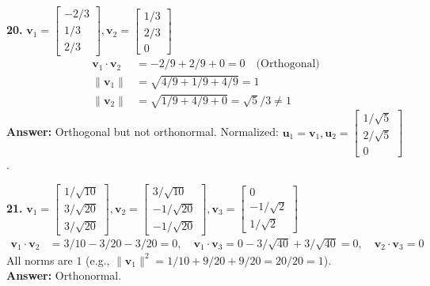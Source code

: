 \documentclass[11pt, letterpaper]{article}
\theoremstyle{definition}
\theoremstyle{remark}
\begin{document}
\textbf{20.} $\mathbf{v}_1 = \begin{bmatrix} -2/3 \\ 1/3 \\ 2/3 \end{bmatrix}, \mathbf{v}_2 = \begin{bmatrix} 1/3 \\ 2/3 \\ 0 \end{bmatrix}$
\begin{align*}
    \mathbf{v}_1 \cdot \mathbf{v}_2 &= -2/9 + 2/9 + 0 = 0 \quad \text{(Orthogonal)} \\
    \|\mathbf{v}_1\| &= \sqrt{4/9 + 1/9 + 4/9} = 1 \\
    \|\mathbf{v}_2\| &= \sqrt{1/9 + 4/9 + 0} = \sqrt{5}/3 \neq 1
\end{align*}
\textbf{Answer:} Orthogonal but not orthonormal. Normalized: $\mathbf{u}_1 = \mathbf{v}_1, \mathbf{u}_2 = \begin{bmatrix} 1/\sqrt{5} \\ 2/\sqrt{5} \\ 0 \end{bmatrix}$.

\textbf{21.} $\mathbf{v}_1 = \begin{bmatrix} 1/\sqrt{10} \\ 3/\sqrt{20} \\ 3/\sqrt{20} \end{bmatrix}, \mathbf{v}_2 = \begin{bmatrix} 3/\sqrt{10} \\ -1/\sqrt{20} \\ -1/\sqrt{20} \end{bmatrix}, \mathbf{v}_3 = \begin{bmatrix} 0 \\ -1/\sqrt{2} \\ 1/\sqrt{2} \end{bmatrix}$
\begin{align*}
    \mathbf{v}_1 \cdot \mathbf{v}_2 &= 3/10 - 3/20 - 3/20 = 0, \quad \mathbf{v}_1 \cdot \mathbf{v}_3 = 0 - 3/\sqrt{40} + 3/\sqrt{40} = 0, \quad \mathbf{v}_2 \cdot \mathbf{v}_3 = 0
\end{align*}
All norms are $1$ (e.g., $\|\mathbf{v}_1\|^2 = 1/10 + 9/20 + 9/20 = 20/20 = 1$). \\
\textbf{Answer:} Orthonormal.
\end{document}
